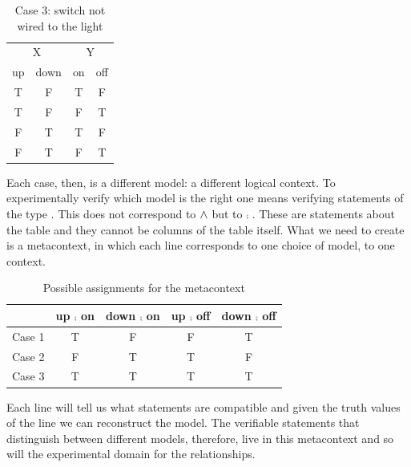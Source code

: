 \documentclass[11pt,letterpaper,fleqn]{memoir} %
\begin{document}
\begin{table}[h]
	\centering
	\begin{tabular}{c|c|c|c}
		\multicolumn{2}{c|}{X} & \multicolumn{2}{c}{Y} \\
		up & down & on & off \\
		\hline
		T & F & T & F \\
		T & F & F & T \\
		F & T & T & F \\
		F & T & F & T \\
	\end{tabular}
	\caption{Case 3: switch not wired to the light}
\end{table}

Each case, then, is a different model: a different logical context. To experimentally verify which model is the right one means verifying statements of the type . This does not correspond to  $\wedge$  but to  $\comp$ . These are statements about the table and they cannot be columns of the table itself. What we need to create is a metacontext, in which each line corresponds to one choice of model, to one context.

\begin{table}[h]
	\centering
	\begin{tabular}{r|c|c|c|c}
		& up $\comp$ on & down $\comp$ on & up $\comp$ off & down $\comp$ off \\
		\hline
		Case 1 & T & F & F & T \\
		Case 2 & F & T & T & F \\
		Case 3 & T & T & T & T \\
	\end{tabular}
	\caption{Possible assignments for the metacontext}
\end{table}

Each line will tell us what statements are compatible and given the truth values of the line we can reconstruct the model. The verifiable statements that distinguish between different models, therefore, live in this metacontext and so will the experimental domain for the relationships.
\end{document}
